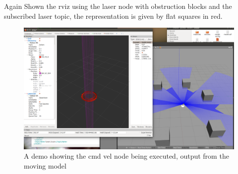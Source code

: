 \documentclass[a4paper, 10pt]{IEEEconf}
\begin{document}
\clearpage
Again Shown the rviz using the laser node with obstruction blocks and the subscribed laser topic, the representation is given by flat squares in red.

\begin{figure}[H]
  \includegraphics[width=0.8\linewidth, center]{images/rvizlaser}
  \caption{A demo showing the cmd vel node being executed, output from the moving model}
  \label{fig:A demo showing the cmd vel node being executed, output from the moving model}
\end{figure}




 


\end{document}
